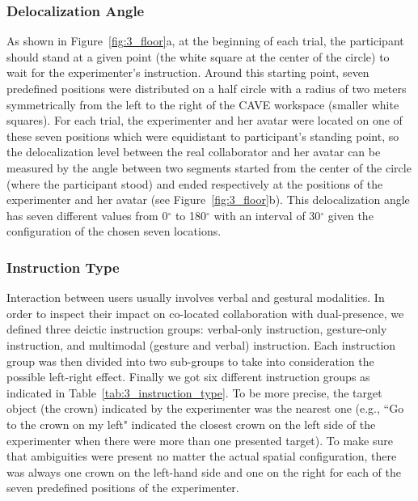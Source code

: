 \subsubsection{Delocalization Angle}
As shown in Figure~\ref{fig:3_floor}a, at the beginning of each trial, the participant should stand at a given point (the white square at the center of the circle) to wait for the experimenter's instruction. Around this starting point, seven predefined positions were distributed on a half circle with a radius of two meters symmetrically from the left to the right of the CAVE workspace (smaller white squares). For each trial, the experimenter and her avatar were located on one of these seven positions which were equidistant to participant's standing point, so the delocalization level between the real collaborator and her avatar can be measured by the angle between two segments started from the center of the circle (where the participant stood) and ended respectively at the positions of the experimenter and her avatar (see Figure~\ref{fig:3_floor}b). This delocalization angle has seven different values from 0$^\circ$ to 180$^\circ$ with an interval of 30$^\circ$ given the configuration of the chosen seven locations.

\subsubsection{Instruction Type}
Interaction between users usually involves verbal and gestural modalities. In order to inspect their impact on co-located collaboration with dual-presence, we defined three deictic instruction groups: verbal-only instruction, gesture-only instruction, and multimodal (gesture and verbal) instruction. Each instruction group was then divided into two sub-groups to take into consideration the possible left-right effect. Finally we got six different instruction groups as indicated in Table~\ref{tab:3_instruction_type}. To be more precise, the target object (the crown) indicated by the experimenter was the nearest one (e.g., ``Go to the crown on my left" indicated the closest crown on the left side of the experimenter when there were more than one presented target). To make sure that ambiguities were present no matter the actual spatial configuration, there was always one crown on the left-hand side and one on the right for each of the seven predefined positions of the experimenter.

